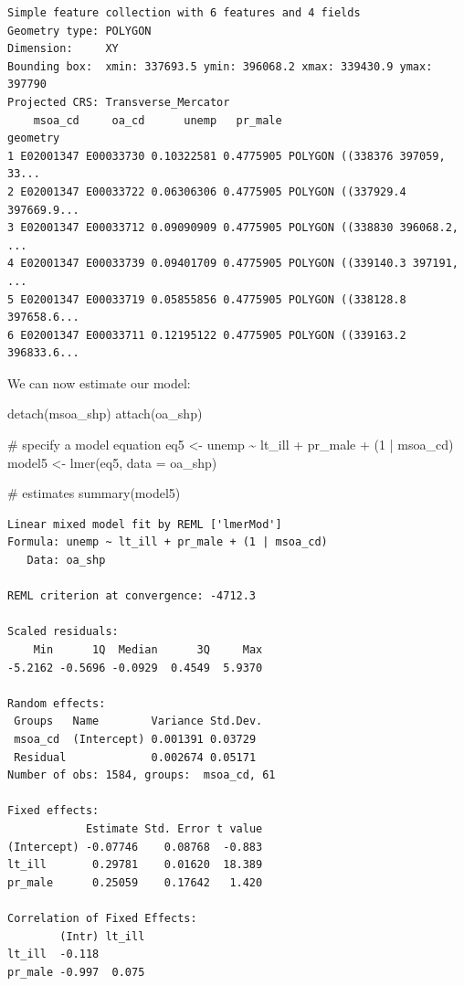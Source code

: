\documentclass[
  letterpaper,
  DIV=11,
  numbers=noendperiod,
  oneside]{scrreprt}
\newenvironment{Shaded}{\begin{snugshade}}{\end{snugshade}}
\newcommand{\AttributeTok}[1]{\textcolor[rgb]{0.40,0.45,0.13}{#1}}
\newcommand{\CommentTok}[1]{\textcolor[rgb]{0.37,0.37,0.37}{#1}}
\newcommand{\DecValTok}[1]{\textcolor[rgb]{0.68,0.00,0.00}{#1}}
\newcommand{\FunctionTok}[1]{\textcolor[rgb]{0.28,0.35,0.67}{#1}}
\newcommand{\NormalTok}[1]{\textcolor[rgb]{0.00,0.23,0.31}{#1}}
\newcommand{\OtherTok}[1]{\textcolor[rgb]{0.00,0.23,0.31}{#1}}
\newcommand{\SpecialCharTok}[1]{\textcolor[rgb]{0.37,0.37,0.37}{#1}}
\begin{document}
\begin{verbatim}
Simple feature collection with 6 features and 4 fields
Geometry type: POLYGON
Dimension:     XY
Bounding box:  xmin: 337693.5 ymin: 396068.2 xmax: 339430.9 ymax: 397790
Projected CRS: Transverse_Mercator
    msoa_cd     oa_cd      unemp   pr_male                       geometry
1 E02001347 E00033730 0.10322581 0.4775905 POLYGON ((338376 397059, 33...
2 E02001347 E00033722 0.06306306 0.4775905 POLYGON ((337929.4 397669.9...
3 E02001347 E00033712 0.09090909 0.4775905 POLYGON ((338830 396068.2, ...
4 E02001347 E00033739 0.09401709 0.4775905 POLYGON ((339140.3 397191, ...
5 E02001347 E00033719 0.05855856 0.4775905 POLYGON ((338128.8 397658.6...
6 E02001347 E00033711 0.12195122 0.4775905 POLYGON ((339163.2 396833.6...
\end{verbatim}

We can now estimate our model:

\begin{Shaded}
\begin{Highlighting}[]
\FunctionTok{detach}\NormalTok{(msoa\_shp)}
\FunctionTok{attach}\NormalTok{(oa\_shp)}

\CommentTok{\# specify a model equation}
\NormalTok{eq5 }\OtherTok{\textless{}{-}}\NormalTok{ unemp }\SpecialCharTok{\textasciitilde{}}\NormalTok{ lt\_ill }\SpecialCharTok{+}\NormalTok{ pr\_male }\SpecialCharTok{+}\NormalTok{ (}\DecValTok{1} \SpecialCharTok{|}\NormalTok{ msoa\_cd)}
\NormalTok{model5 }\OtherTok{\textless{}{-}} \FunctionTok{lmer}\NormalTok{(eq5, }\AttributeTok{data =}\NormalTok{ oa\_shp)}

\CommentTok{\# estimates}
\FunctionTok{summary}\NormalTok{(model5)}
\end{Highlighting}
\end{Shaded}

\begin{verbatim}
Linear mixed model fit by REML ['lmerMod']
Formula: unemp ~ lt_ill + pr_male + (1 | msoa_cd)
   Data: oa_shp

REML criterion at convergence: -4712.3

Scaled residuals: 
    Min      1Q  Median      3Q     Max 
-5.2162 -0.5696 -0.0929  0.4549  5.9370 

Random effects:
 Groups   Name        Variance Std.Dev.
 msoa_cd  (Intercept) 0.001391 0.03729 
 Residual             0.002674 0.05171 
Number of obs: 1584, groups:  msoa_cd, 61

Fixed effects:
            Estimate Std. Error t value
(Intercept) -0.07746    0.08768  -0.883
lt_ill       0.29781    0.01620  18.389
pr_male      0.25059    0.17642   1.420

Correlation of Fixed Effects:
        (Intr) lt_ill
lt_ill  -0.118       
pr_male -0.997  0.075
\end{verbatim}
\end{document}
